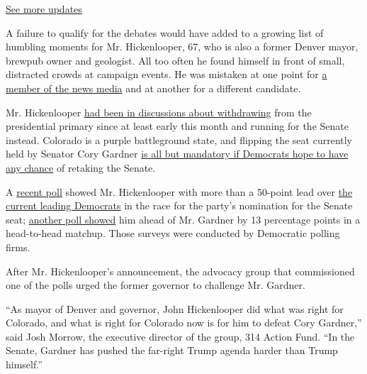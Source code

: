 \href{https://www.nytimes.com/2020/07/31/us/elections/biden-vs-trump.html?action=click\&pgtype=Article\&state=default\&region=MAIN_CONTENT_1\&context=storylines_live_updates}{See
more updates}

A failure to qualify for the debates would have added to a growing list
of humbling moments for Mr. Hickenlooper, 67, who is also a former
Denver mayor, brewpub owner and geologist. All too often he found
himself in front of small, distracted crowds at campaign events. He was
mistaken at one point for
\href{https://twitter.com/scottdetrow/status/1143929727654289408?ref_src=twsrc\%5Etfw\%7Ctwcamp\%5Etweetembed\%7Ctwterm\%5E1143929727654289408\&ref_url=https\%3A\%2F\%2Fwww.businessinsider.com\%2Fjohn-hickenlooper-mistaken-for-a-reporter-at-the-democratic-debates-2019-6\%3Futm_source\%3Dhearst\%26utm_medium\%3Dreferral\%26utm_content\%3Dallverticals}{a
member of the news media} and at another for a different candidate.

Mr. Hickenlooper
\href{https://www.nytimes.com/2019/08/13/us/politics/john-hickenlooper-2020-senate.html?smid=nytcore-ios-share}{had
been in discussions about withdrawing} from the presidential primary
since at least early this month and running for the Senate instead.
Colorado is a purple battleground state, and flipping the seat currently
held by Senator Cory Gardner
\href{https://www.nytimes.com/2019/05/03/us/democrats-senate-campaign.html}{is
all but mandatory if Democrats hope to have any chance} of retaking the
Senate.

A
\href{https://www.denverpost.com/2019/08/12/john-hickenlooper-2020-senate-cory-gardner/}{recent
poll} showed Mr. Hickenlooper with more than a 50-point lead over
\href{https://ewscripps.brightspotcdn.com/26/f4/625f79044305a2f3bd9b98ce8c4f/kr-colorado-senate-dp-voter-poll-july-2019-xtabs.pdf}{the
current leading Democrats} in the race for the party's nomination for
the Senate seat;
\href{https://documentcloud.adobe.com/link/track?uri=urn:aaid:scds:US:f9273f93-44fc-411d-ab25-6e88b356e58d}{another
poll showed} him ahead of Mr. Gardner by 13 percentage points in a
head-to-head matchup. Those surveys were conducted by Democratic polling
firms.

After Mr. Hickenlooper's announcement, the advocacy group that
commissioned one of the polls urged the former governor to challenge Mr.
Gardner.

``As mayor of Denver and governor, John Hickenlooper did what was right
for Colorado, and what is right for Colorado now is for him to defeat
Cory Gardner,'' said Josh Morrow, the executive director of the group,
314 Action Fund. ``In the Senate, Gardner has pushed the far-right Trump
agenda harder than Trump himself.''

